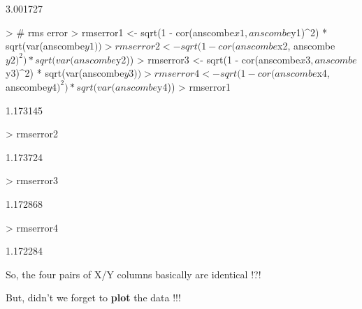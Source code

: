 \documentclass[12pt,letterpaper,final]{article}
\begin{document}
\begin{Schunk}
\begin{Soutput}
[1] 3.001727
\end{Soutput}
\begin{Sinput}
> # rms error
> rmserror1 <- sqrt(1 - cor(anscombe$x1, anscombe$y1)^2) * sqrt(var(anscombe$y1))
> rmserror2 <- sqrt(1 - cor(anscombe$x2, anscombe$y2)^2) * sqrt(var(anscombe$y2))
> rmserror3 <- sqrt(1 - cor(anscombe$x3, anscombe$y3)^2) * sqrt(var(anscombe$y3))
> rmserror4 <- sqrt(1 - cor(anscombe$x4, anscombe$y4)^2) * sqrt(var(anscombe$y4))
> rmserror1
\end{Sinput}
\begin{Soutput}
[1] 1.173145
\end{Soutput}
\begin{Sinput}
> rmserror2
\end{Sinput}
\begin{Soutput}
[1] 1.173724
\end{Soutput}
\begin{Sinput}
> rmserror3
\end{Sinput}
\begin{Soutput}
[1] 1.172868
\end{Soutput}
\begin{Sinput}
> rmserror4
\end{Sinput}
\begin{Soutput}
[1] 1.172284
\end{Soutput}
\end{Schunk}


So, the four pairs of X/Y columns basically are identical !?!


\if{}
But, didn't we forget to {\bf plot} the data !!! 

\end{document}
